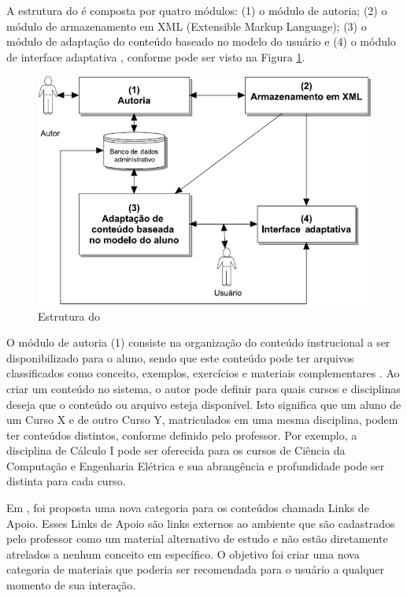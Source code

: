 A estrutura do \adaptwebspace é composta por quatro módulos: (1) o módulo de autoria; (2) o
módulo de armazenamento em XML (Extensible Markup Language); (3) o módulo de adaptação do conteúdo baseado no modelo do
usuário e (4) o módulo de interface adaptativa \cite{gasparini2003interface}, conforme pode ser visto na Figura
\ref{fig:adaptweb-arquitetura}.

\begin{figure}[htb]
  \caption{\label{fig:adaptweb-arquitetura}Estrutura do \adaptweb}
  \begin{center}
      \includegraphics[scale=1.0]{./Figuras/adaptweb-arquitetura.png}
  \end{center}
\end{figure}

O módulo de autoria (1) consiste na organização do conteúdo instrucional a ser disponibilizado para o aluno, sendo que
este conteúdo pode ter arquivos classificados como conceito, exemplos, exercícios e materiais complementares
\cite{gasparini2003interface}. Ao criar um conteúdo no sistema, o autor pode definir para quais cursos e disciplinas
deseja que o conteúdo ou arquivo esteja disponível. Isto significa que um aluno de um Curso X e de outro Curso Y,
matriculados em uma mesma disciplina, podem ter conteúdos distintos, conforme definido pelo professor. Por exemplo, a
disciplina de Cálculo I pode ser oferecida para os cursos de Ciência da Computação e Engenharia Elétrica e sua
abrangência e profundidade pode ser distinta para cada curso.

Em , foi proposta uma nova categoria para os conteúdos chamada Links de Apoio. Esses Links de Apoio
são links externos ao ambiente \adaptwebspace que são cadastrados pelo professor como um
material alternativo de estudo e não estão diretamente atrelados a nenhum conceito em específico. O objetivo foi criar
uma nova categoria de materiais que poderia ser recomendada para o usuário a qualquer momento de sua interação.

